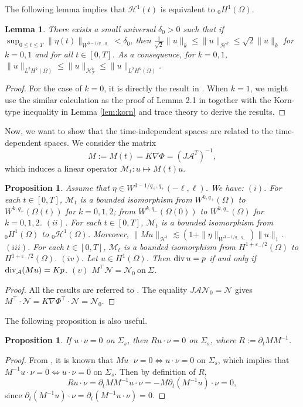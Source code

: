 \documentclass[letterpaper,reqno,10pt,twoside]{amsart}
\newtheorem{lemma}[theorem]{Lemma}
\newtheorem{proposition}[theorem]{Proposition}
\theoremstyle{definition}
\theoremstyle{remark}
\def\p{\partial}
\def\Om{\Omega}
\def\dive{\mathop{\rm div}\nolimits}
\begin{document}
	The following lemma implies that $\mathcal{H}^1(t)$ is equivalent to ${}_0H^1(\Om)$.
	\begin{lemma}\label{lem:equivalence_norm}
		There exists a small universal $\delta_0>0$ such that if $\sup_{0\le t\le T}\|\eta(t)\|_{W^{3-1/q_-, q_-}}<\delta_0$,
		then
		$
		\frac{1}{\sqrt{2}}\|u\|_k\le\|u\|_{\mathcal{H}^k}\le\sqrt{2}\|u\|_k$
		for $k=0, 1$ and for all $t\in[0, T]$. As a consequence, for $k=0, 1$,
		$
		\|u\|_{L^2H^k(\Om)}\le \|u\|_{\mathcal{H}^k_T}\le \|u\|_{L^2H^k(\Om)}$.
	\end{lemma}
	\begin{proof}
		For the case of $k=0$, it is directly the result in \cite{GT1}. When $k=1$, we might use the similar calculation as the proof of Lemma 2.1 in \cite{GT1} together with the Korn-type inequality in Lemma \ref{lem:korn} and trace theory to derive the results.
	\end{proof}
	
	
	Now, we want to show that the time-independent spaces are related to the time-dependent spaces.
	We consider the matrix
	\begin{equation}\label{def:M}
		M:=M(t)=K\nabla\Phi=(J\mathcal{A}^T)^{-1},
	\end{equation}
	which induces a linear operator $\mathcal{M}_t : u\mapsto M(t)u$.
	
	\begin{proposition}\label{prop:isomorphism}
		Assume that $\eta\in W^{3-1/q_+, q_+}(-\ell, \ell)$. We have:
		$(i)$. For each $t\in [0,T]$, $\mathcal{M}_t $ is a bounded isomorphism from $W^{k,q_+}(\Om)$ to $W^{k,q_+}(\Om(t))$ for $k=0, 1,2$; from $W^{k,q_-}(\Om(0))$ to $W^{k,q_-}(\Om)$ for $k=0, 1,2$.
		$(ii)$. For each $t\in [0,T]$, $\mathcal{M}_t $ is a bounded isomorphism from ${}_0H^1(\Om)$ to ${}_0\mathcal{H}^1(\Om)$. Moreover,
		$
		\|Mu\|_{\mathcal{H}^1}\lesssim (1+\|\eta\|_{W^{3-1/q_-, q_-}})\|u\|_1$.
		$(iii)$. For each $t
		\in [0,T]$, $\mathcal{M}_t $ is a bounded isomorphism from $H^{1+\varepsilon_-/2}(\Om)$ to $H^{1+\varepsilon_-/2}(\Om)$. $(iv)$. Let $u\in H^1(\Om)$. Then $\dive u=p$ if and only if $\dive_{\mathcal{A}}(Mu)=Kp$.
		$(v)$ $ M^\top\mathcal{N}=\mathcal{N}_0\ \text{on}\ \Sigma$.
	\end{proposition}
	\begin{proof}
		All the results are referred to \cite{GT2020}. The equality $J\mathcal{A}\mathcal{N}_0=\mathcal{N}$
		gives $M^\top\cdot\mathcal{N}= K\nabla \Phi^\top \cdot \mathcal{N}=\mathcal{N}_0$.
	\end{proof}
	The following proposition is also useful.
	\begin{proposition}\label{prop:solid_boundary}
		If $u\cdot\nu=0$ on $\Sigma_s$, then $Ru\cdot\nu=0$ on $\Sigma_s$, where $R:=\p_tMM^{-1}$.
	\end{proposition}
	\begin{proof}
		From \cite{GT18}, it is known that $Mu\cdot\nu=0\Leftrightarrow u\cdot\nu=0$ on $\Sigma_s$, which implies that
		$M^{-1}u\cdot\nu=0\Leftrightarrow u\cdot\nu=0$ on $\Sigma_s$.
		Then by definition of $R$,
		\[
		Ru\cdot\nu=\p_tMM^{-1}u\cdot\nu=-M\p_t(M^{-1}u)\cdot\nu=0,
		\]
		since $\p_t(M^{-1}u)\cdot\nu=\p_t(M^{-1}u\cdot\nu)=0$.
	\end{proof}
	
\end{document}
